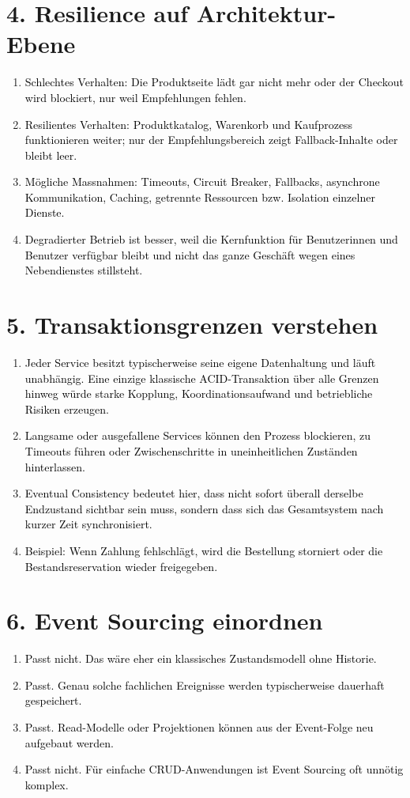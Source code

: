 \documentclass[11pt,a4paper]{article}
\newcommand{\solution}[1]{\textcolor{black}{#1}}
\begin{document}
\section*{4. Resilience auf Architektur-Ebene}
\begin{enumerate}
  \item \solution{Schlechtes Verhalten: Die Produktseite lädt gar nicht mehr oder der Checkout wird blockiert, nur weil Empfehlungen fehlen.}
  \item \solution{Resilientes Verhalten: Produktkatalog, Warenkorb und Kaufprozess funktionieren weiter; nur der Empfehlungsbereich zeigt Fallback-Inhalte oder bleibt leer.}
  \item \solution{Mögliche Massnahmen: Timeouts, Circuit Breaker, Fallbacks, asynchrone Kommunikation, Caching, getrennte Ressourcen bzw. Isolation einzelner Dienste.}
  \item \solution{Degradierter Betrieb ist besser, weil die Kernfunktion für Benutzerinnen und Benutzer verfügbar bleibt und nicht das ganze Geschäft wegen eines Nebendienstes stillsteht.}
\end{enumerate}

\section*{5. Transaktionsgrenzen verstehen}
\begin{enumerate}
  \item \solution{Jeder Service besitzt typischerweise seine eigene Datenhaltung und läuft unabhängig. Eine einzige klassische ACID-Transaktion über alle Grenzen hinweg würde starke Kopplung, Koordinationsaufwand und betriebliche Risiken erzeugen.}
  \item \solution{Langsame oder ausgefallene Services können den Prozess blockieren, zu Timeouts führen oder Zwischenschritte in uneinheitlichen Zuständen hinterlassen.}
  \item \solution{Eventual Consistency bedeutet hier, dass nicht sofort überall derselbe Endzustand sichtbar sein muss, sondern dass sich das Gesamtsystem nach kurzer Zeit synchronisiert.}
  \item \solution{Beispiel: Wenn Zahlung fehlschlägt, wird die Bestellung storniert oder die Bestandsreservation wieder freigegeben.}
\end{enumerate}

\section*{6. Event Sourcing einordnen}
\begin{enumerate}
  \item \solution{Passt nicht. Das wäre eher ein klassisches Zustandsmodell ohne Historie.}
  \item \solution{Passt. Genau solche fachlichen Ereignisse werden typischerweise dauerhaft gespeichert.}
  \item \solution{Passt. Read-Modelle oder Projektionen können aus der Event-Folge neu aufgebaut werden.}
  \item \solution{Passt nicht. Für einfache CRUD-Anwendungen ist Event Sourcing oft unnötig komplex.}
\end{enumerate}
\end{document}
